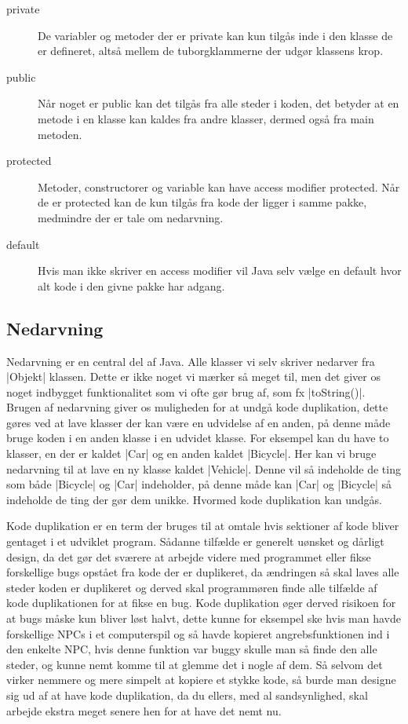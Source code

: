 \begin{description}
\item [private]     De variabler og metoder der er private kan kun tilgås inde
                    i den klasse de er defineret, altså mellem de tuborgklammerne
                    der udgør klassens krop.
\item [public]      Når noget er public kan det tilgås fra alle steder i koden,
                    det betyder at en metode i en klasse kan kaldes fra andre
                    klasser, dermed også fra main metoden.
\item [protected]   Metoder, constructorer og variable kan have access modifier
                    protected. Når de er protected kan de kun tilgås fra kode
                    der ligger i samme pakke, medmindre der er tale om
                    nedarvning.
\item [default]     Hvis man ikke skriver en access modifier vil Java selv vælge
                    en default hvor alt kode i den givne pakke har adgang.
\end{description}

\subsection{Nedarvning}

Nedarvning er en central del af Java. Alle klasser vi selv skriver
nedarver fra \JavaInline|Objekt| klassen. Dette er ikke noget vi
mærker så meget til, men det giver os noget indbygget funktionalitet
som vi ofte gør brug af, som fx \JavaInline|toString()|. Brugen af
nedarvning giver os muligheden for at undgå kode duplikation, dette
gøres ved at lave klasser der kan være en udvidelse af en anden, på
denne måde bruge koden i en anden klasse i en udvidet klasse. For
eksempel kan du have to klasser, en der er kaldet \JavaInline|Car| og
en anden kaldet \JavaInline|Bicycle|. Her kan vi bruge nedarvning til
at lave en ny klasse kaldet \JavaInline|Vehicle|. Denne vil så
indeholde de ting som både \JavaInline|Bicycle| og \JavaInline|Car|
indeholder, på denne måde kan \JavaInline|Car| og \JavaInline|Bicycle|
så indeholde de ting der gør dem unikke. Hvormed kode duplikation kan
undgås.

Kode duplikation er en term der bruges til at omtale hvis sektioner af
kode bliver gentaget i et udviklet program. Sådanne tilfælde er
generelt uønsket og dårligt design, da det gør det sværere at arbejde
videre med programmet eller fikse forskellige bugs opstået fra kode
der er duplikeret, da ændringen så skal laves alle steder koden er
duplikeret og derved skal programmøren finde alle tilfælde af kode
duplikationen for at fikse en bug. Kode duplikation øger derved
risikoen for at bugs måske kun bliver løst halvt, dette kunne for
eksempel ske hvis man havde forskellige NPCs i et computerspil og så
havde kopieret angrebsfunktionen ind i den enkelte NPC, hvis denne
funktion var buggy skulle man så finde den alle steder, og kunne nemt
komme til at glemme det i nogle af dem. Så selvom det virker nemmere
og mere simpelt at kopiere et stykke kode, så burde man designe sig ud
af at have kode duplikation, da du ellers, med al sandsynlighed, skal
arbejde ekstra meget senere hen for at have det nemt nu.

